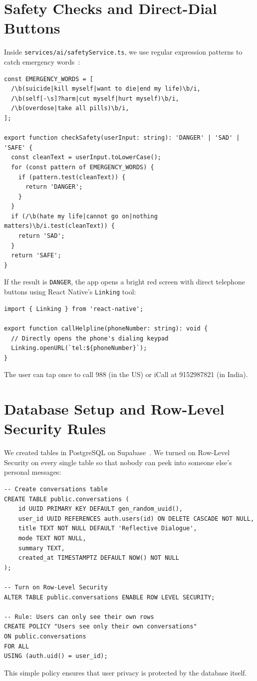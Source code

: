 \section{Safety Checks and Direct-Dial Buttons}
\label{sec:impl_safety}

Inside \texttt{services/ai/safetyService.ts}, we use regular expression patterns to catch emergency words~\cite{miner2016smartphone}:
\begin{verbatim}
const EMERGENCY_WORDS = [
  /\b(suicide|kill myself|want to die|end my life)\b/i,
  /\b(self[-\s]?harm|cut myself|hurt myself)\b/i,
  /\b(overdose|take all pills)\b/i,
];

export function checkSafety(userInput: string): 'DANGER' | 'SAD' | 'SAFE' {
  const cleanText = userInput.toLowerCase();
  for (const pattern of EMERGENCY_WORDS) {
    if (pattern.test(cleanText)) {
      return 'DANGER';
    }
  }
  if (/\b(hate my life|cannot go on|nothing matters)\b/i.test(cleanText)) {
    return 'SAD';
  }
  return 'SAFE';
}
\end{verbatim}

If the result is \texttt{DANGER}, the app opens a bright red screen with direct telephone buttons using React Native's \texttt{Linking} tool:
\begin{verbatim}
import { Linking } from 'react-native';

export function callHelpline(phoneNumber: string): void {
  // Directly opens the phone's dialing keypad
  Linking.openURL(`tel:${phoneNumber}`);
}
\end{verbatim}
The user can tap once to call 988 (in the US) or iCall at 9152987821 (in India).

\section{Database Setup and Row-Level Security Rules}
\label{sec:impl_database}

We created tables in PostgreSQL on Supabase~\cite{supabase2024rls}. We turned on Row-Level Security on every single table so that nobody can peek into someone else's personal messages:
\begin{verbatim}
-- Create conversations table
CREATE TABLE public.conversations (
    id UUID PRIMARY KEY DEFAULT gen_random_uuid(),
    user_id UUID REFERENCES auth.users(id) ON DELETE CASCADE NOT NULL,
    title TEXT NOT NULL DEFAULT 'Reflective Dialogue',
    mode TEXT NOT NULL,
    summary TEXT,
    created_at TIMESTAMPTZ DEFAULT NOW() NOT NULL
);

-- Turn on Row-Level Security
ALTER TABLE public.conversations ENABLE ROW LEVEL SECURITY;

-- Rule: Users can only see their own rows
CREATE POLICY "Users see only their own conversations" 
ON public.conversations 
FOR ALL 
USING (auth.uid() = user_id);
\end{verbatim}
This simple policy ensures that user privacy is protected by the database itself.
